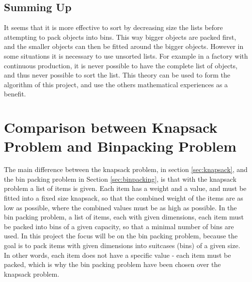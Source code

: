\subsection{Summing Up}
It seems that it is more effective to sort by decreasing size the lists before attempting to pack objects into bins. This way bigger objects are packed first, and the smaller objects can then be fitted around the bigger objects. However in some situations it is necessary to use unsorted lists. For example in a factory with continuous production, it is never possible to have the complete list of objects, and thus never possible to sort the list. This theory can be used to form the algorithm of this project, and use the others mathematical experiences as a benefit.
\section{Comparison between Knapsack Problem and Binpacking Problem}
The main difference between the knapsack problem, in section \ref{sec:knapsack}, and the bin packing problem in Section \ref{sec:binpacking}, is that with the knapsack problem a list of items is given. Each item has a weight and a value, and must be fitted into a fixed size knapsack, so that the combined weight of the items are as low as possible, where the combined values must be as high as possible. In the bin packing problem, a list of items, each with given dimensions, each item must be packed into bins of a given capacity, so that a minimal number of bins are used. In this project the focus will be on the bin packing problem, because the goal is to pack items with given dimensions into suitcases (bins) of a given size. In other words, each item does not have a specific value - each item must be packed, which is why the bin packing problem have been chosen over the knapsack problem.